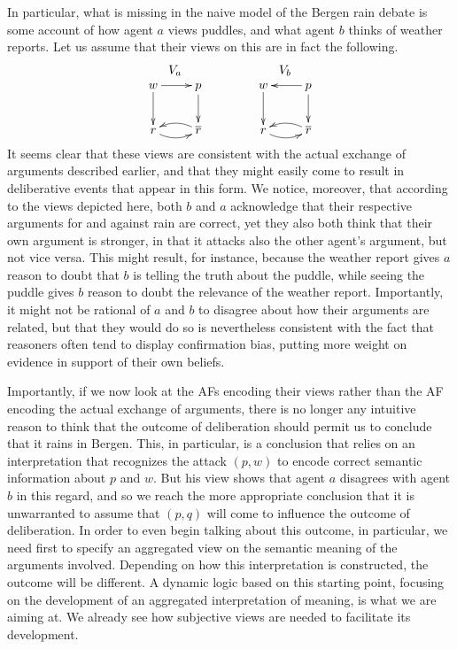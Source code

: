 \documentclass[greybox]{svmult}
\renewcommand{\bar}[1]{\overline{#1}}
\begin{document}
In particular, what is missing in the naive model of the Bergen rain debate is some account of how agent $a$ views puddles, and what agent $b$ thinks of weather reports. Let us assume that their views on this are in fact the following.
$$
\begin{array}{cc}
V_{a} \hspace{3em} & V_{b} \\
\xymatrix{ w \ar[d] \ar[r] & p \ar[d] \\ r \ar@/_/[r] & \bar r \ar@/_/[l] } \hspace{3em} &
\xymatrix{w \ar[d] & p \ar[d] \ar[l] \\ r \ar@/_/[r] & \bar r \ar@/_/[l] }
\end{array}
$$
It seems clear that these views are consistent with the actual exchange of arguments described earlier, and that they might easily come to result in deliberative events that appear in this form. We notice, moreover, that according to the views depicted here, both $b$ and $a$ acknowledge that their respective arguments for and against rain are correct, yet they also both think that their own argument is stronger, in that it attacks also the other agent's argument, but not vice versa. This might result, for instance, because the weather report gives $a$ reason to doubt that $b$ is telling the truth about the puddle, while seeing the puddle gives $b$ reason to doubt the relevance of the weather report. Importantly, it might not be rational of $a$ and $b$ to disagree about how their arguments are related, but that they would do so is nevertheless consistent with the fact that reasoners often tend to display confirmation bias, putting more weight on evidence in support of their own beliefs.

Importantly, if we now look at the AFs encoding their views rather than the AF encoding the actual exchange of arguments, there is no longer any intuitive reason to think that the outcome of deliberation should permit us to conclude that it rains in Bergen. This, in particular, is a conclusion that relies on an interpretation that recognizes the attack $(p,w)$ to encode correct semantic information about $p$ and $w$. But his view shows that agent $a$ disagrees with agent $b$ in this regard, and so we reach the more appropriate conclusion that it is unwarranted to assume that $(p,q)$ will come to influence the outcome of deliberation. In order to even begin talking about this outcome, in particular, we need first to specify an aggregated view on the semantic meaning of the arguments involved. Depending on how this interpretation is constructed, the outcome will be different. A dynamic logic based on this starting point, focusing on the development of an aggregated interpretation of meaning, is what we are aiming at. We already see how subjective views are needed to facilitate its development.
\end{document}
